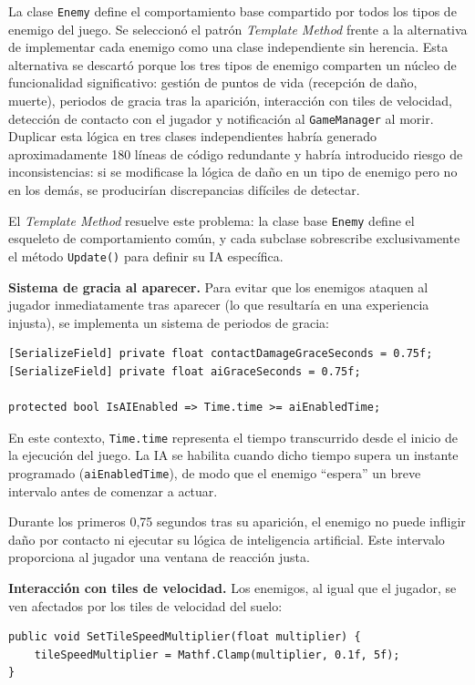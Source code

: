 La clase \texttt{Enemy} define el comportamiento base compartido por todos los tipos de enemigo del juego. Se seleccionó el patrón \textit{Template Method} frente a la alternativa de implementar cada enemigo como una clase independiente sin herencia. Esta alternativa se descartó porque los tres tipos de enemigo comparten un núcleo de funcionalidad significativo: gestión de puntos de vida (recepción de daño, muerte), periodos de gracia tras la aparición, interacción con tiles de velocidad, detección de contacto con el jugador y notificación al \texttt{GameManager} al morir. Duplicar esta lógica en tres clases independientes habría generado aproximadamente 180 líneas de código redundante y habría introducido riesgo de inconsistencias: si se modificase la lógica de daño en un tipo de enemigo pero no en los demás, se producirían discrepancias difíciles de detectar.

El \textit{Template Method} resuelve este problema: la clase base \texttt{Enemy} define el esqueleto de comportamiento común, y cada subclase sobrescribe exclusivamente el método \texttt{Update()} para definir su IA específica.

\textbf{Sistema de gracia al aparecer.} Para evitar que los enemigos ataquen al jugador inmediatamente tras aparecer (lo que resultaría en una experiencia injusta), se implementa un sistema de periodos de gracia:

\begin{lstlisting}
[SerializeField] private float contactDamageGraceSeconds = 0.75f;
[SerializeField] private float aiGraceSeconds = 0.75f;

protected bool IsAIEnabled => Time.time >= aiEnabledTime;
\end{lstlisting}


En este contexto, \texttt{Time.time} representa el tiempo transcurrido desde el inicio de la ejecución del juego. La IA se habilita cuando dicho tiempo supera un instante programado (\texttt{aiEnabledTime}), de modo que el enemigo “espera” un breve intervalo antes de comenzar a actuar.

Durante los primeros 0,75 segundos tras su aparición, el enemigo no puede infligir daño por contacto ni ejecutar su lógica de inteligencia artificial. Este intervalo proporciona al jugador una ventana de reacción justa.

\textbf{Interacción con tiles de velocidad.} Los enemigos, al igual que el jugador, se ven afectados por los tiles de velocidad del suelo:

\begin{lstlisting}
public void SetTileSpeedMultiplier(float multiplier) {
    tileSpeedMultiplier = Mathf.Clamp(multiplier, 0.1f, 5f);
}
\end{lstlisting}


